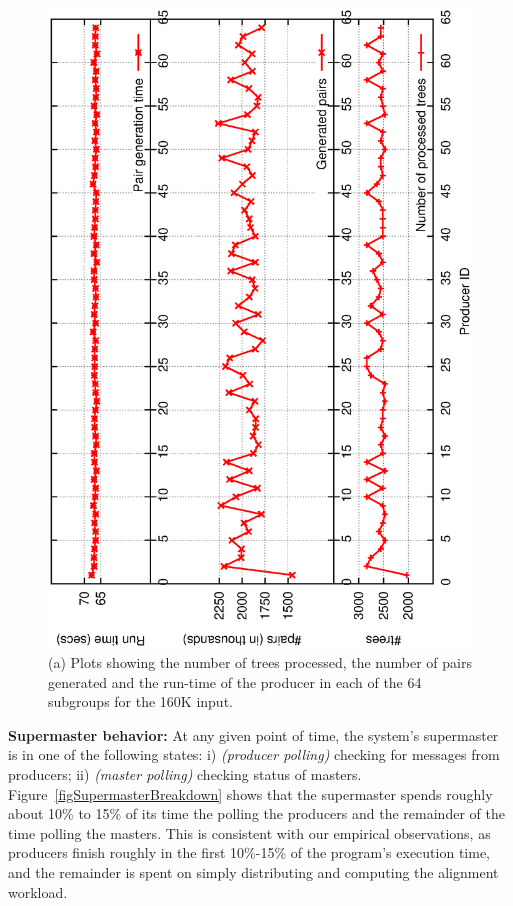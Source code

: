 \documentclass[10pt,journal,letterpaper,compsoc]{IEEEtran}
\begin{document}
\begin{figure}[h]
\centerline{
            \includegraphics[angle=-90, scale=0.33]{producer.eps}
}
\caption{
(a) Plots showing the number of trees processed, the number of pairs generated and the run-time of the producer in each of the 64 subgroups for the 160K input.
}
\label{figProducer}
\end{figure}



{\bf Supermaster behavior:} At any given point of time, the system's supermaster is in one of the following states: i) \emph{(producer polling)} checking for messages from producers; ii) \emph{(master polling)} checking status of masters.  Figure~\ref{figSupermasterBreakdown} shows that the supermaster spends roughly about 10\% to 15\% of its time the polling the producers and the remainder of the time polling the masters. This is consistent with our empirical observations, as producers finish roughly in the first 10\%-15\% of the program's execution time, and the remainder is spent on simply distributing and computing the alignment workload. 
\end{document}
